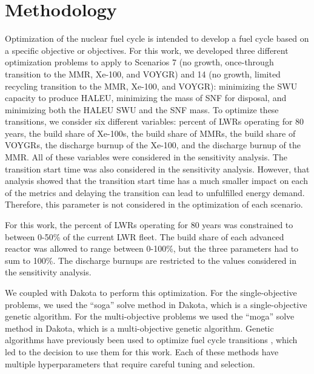 \section{Methodology}
Optimization of the nuclear fuel cycle is intended to develop 
a fuel cycle based on a specific objective or objectives. For this 
work, we developed three different optimization problems to apply to 
Scenarios 7 (no growth, once-through transition to the \gls{MMR}, Xe-100, 
and VOYGR) and 14 (no growth, limited recycling transition to the 
\gls{MMR}, Xe-100, and VOYGR): minimizing the \gls{SWU} capacity to 
produce \gls{HALEU}, minimizing the mass of \gls{SNF} for disposal, 
and minimizing both the \gls{HALEU} \gls{SWU} and the \gls{SNF} 
mass. To optimize these transitions, we consider six different 
variables: percent of \glspl{LWR} operating for 80 years, the build share 
of Xe-100s, the build share of \glspl{MMR}, the build share of VOYGRs, 
the discharge burnup of the Xe-100, and the discharge burnup of the 
\gls{MMR}. All of these variables were considered in the sensitivity 
analysis. The transition start time was also considered in the sensitivity 
analysis. However, that analysis showed that the transition start time has
a much smaller impact on each of the metrics and delaying the transition 
can lead to unfulfilled energy demand. Therefore, this parameter is 
not considered in the optimization of each scenario. 

For this work, the percent of \glspl{LWR} operating for 80 years 
was constrained to between 0-50\% of the current \gls{LWR} fleet. 
The build share of each advanced reactor was allowed to range between 
0-100\%, but the three parameters had to sum to 100\%. The discharge burnups 
are restricted to the values considered in the sensitivity analysis.

We coupled \Cyclus \cite{huff_fundamental_2016} with Dakota 
\cite{adams_dakota_2019} to perform this optimization. For the 
single-objective problems, we used the ``soga'' solve method in 
Dakota, which is a single-objective genetic algorithm. For the 
multi-objective problems we used the ``moga'' solve method in 
Dakota, which is a multi-objective genetic algorithm. Genetic algorithms
have previously been used to optimize fuel cycle transitions 
\cite{passerini_systematic_2014}, which led to the decision to use 
them for this work. Each of these methods have multiple 
hyperparameters that require careful tuning and selection. 

